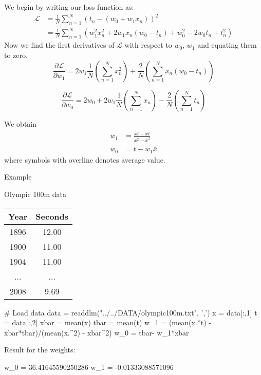 \documentclass[a4paper,11pt]{article} %
\begin{document}
We begin by writing our loss function as:
\begin{align*}
\mathcal{L} & = \frac{1}{N} \sum_{n=1}^{N} \left( t_n - (w_0 + w_1 x_{n}) \right)^2 \\
& = \frac{1}{N} \sum_{n=1}^{N} \left( w_1^2 x_n^2 + 2w_{1}x_{n}(w_0 - t_n) + w_0^2 - 2w_0 t_n + t_n^2 \right)
\end{align*}
%
Now we find the first derivatives of $\mathcal{L}$ with respect to
$w_0$, $w_1$ and equating them to zero.
\begin{equation*}
\frac{\partial\mathcal{L}}{\partial w_1} = 2w_1 \frac{1}{N} \left( \sum_{n=1}^{N} x_n^2 \right) +
\frac{2}{N} \left( \sum_{n=1}^{N} x_{n} (w_0 - t_n) \right)
\end{equation*}

$$
\frac{\partial \mathcal{L}}{\partial w_0} = 2w_0 + 2w_1 \frac{1}{N} \left( \sum_{n=1}^{N} x_n \right) -
\frac{2}{N} \left( \sum_{n=1}^{N} t_n \right)
$$

We obtain
\begin{align}
w_{1} & = \frac{\overline{xt} - \overline{x}\overline{t}}{\overline{x^2} - \overline{x}^2} \\
w_{0} & = \overline{t} - w_{1} \overline{x}
\end{align}
where symbols with overline denotes average value.

Example

Olympic 100m data

\begin{table}[H]
\begin{center}
\begin{tabular}{|c|c|}
\hline
Year & Seconds \\
\hline
1896 & 12.00 \\
1900 & 11.00 \\
1904 & 11.00 \\
...  & ...   \\
2008 & 9.69  \\
\hline
\end{tabular}
\end{center}
\end{table}


\begin{juliacode}
# Load data
data = readdlm("../../DATA/olympic100m.txt", ',')
x = data[:,1]
t = data[:,2]
xbar = mean(x)
tbar = mean(t)
w_1 = (mean(x.*t) - xbar*tbar)/(mean(x.^2) - xbar^2)
w_0 = tbar- w_1*xbar
\end{juliacode}

Result for the weights:
\begin{textcode}
w_0 = 36.41645590250286
w_1 = -0.01333088571096
\end{textcode}
\end{document}

